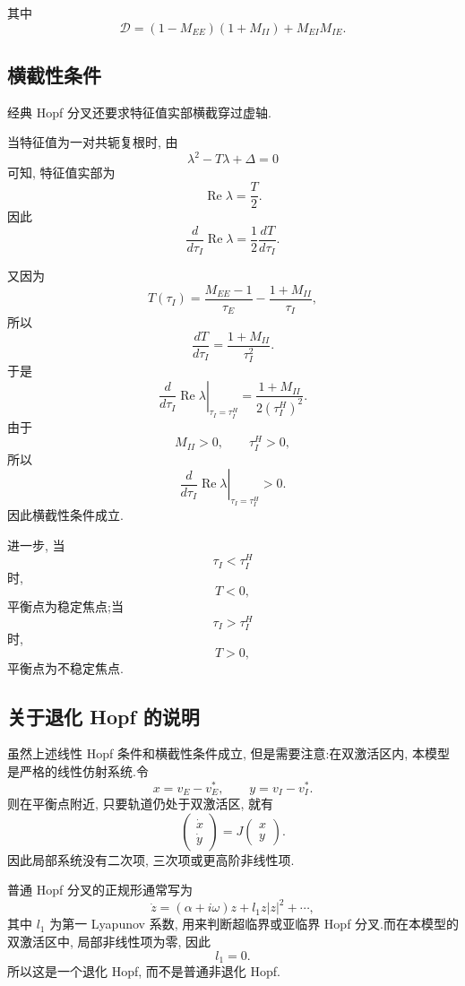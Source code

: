 ﻿\documentclass[UTF8,  zihao=-4]{ctexart}
\begin{document}
其中
\[
\mathcal D
=
(1-M_{EE})(1+M_{II})+M_{EI}M_{IE}.
\]

\subsection{横截性条件}

经典 Hopf 分叉还要求特征值实部横截穿过虚轴.

当特征值为一对共轭复根时,  由
\[
\lambda^2-T\lambda+\Delta=0
\]
可知,  特征值实部为
\[
\operatorname{Re}\lambda=\frac{T}{2}.
\]
因此
\[
\frac{d}{d\tau_I}\operatorname{Re}\lambda
=
\frac12\frac{dT}{d\tau_I}.
\]

又因为
\[
T(\tau_I)
=
\frac{M_{EE}-1}{\tau_E}
-
\frac{1+M_{II}}{\tau_I},  
\]
所以
\[
\frac{dT}{d\tau_I}
=
\frac{1+M_{II}}{\tau_I^2}.
\]
于是
\[
\left.
\frac{d}{d\tau_I}\operatorname{Re}\lambda
\right|_{\tau_I=\tau_I^H}
=
\frac{1+M_{II}}{2(\tau_I^H)^2}.
\]
由于
\[
M_{II}>0,  \qquad \tau_I^H>0,  
\]
所以
\[
\left.
\frac{d}{d\tau_I}\operatorname{Re}\lambda
\right|_{\tau_I=\tau_I^H}
>0.
\]
因此横截性条件成立.

进一步,  当
\[
\tau_I<\tau_I^H
\]
时,  
\[
T<0,  
\]
平衡点为稳定焦点;当
\[
\tau_I>\tau_I^H
\]
时,  
\[
T>0,  
\]
平衡点为不稳定焦点.

\subsection{关于退化 Hopf 的说明}

虽然上述线性 Hopf 条件和横截性条件成立,  但是需要注意:在双激活区内,  本模型是严格的线性仿射系统.令
\[
x=v_E-v_E^*,  
\qquad
y=v_I-v_I^*.
\]
则在平衡点附近,  只要轨道仍处于双激活区,  就有
\[
\begin{pmatrix}
\dot x\\
\dot y
\end{pmatrix}
=
J
\begin{pmatrix}
x\\
y
\end{pmatrix}.
\]
因此局部系统没有二次项,  三次项或更高阶非线性项.

普通 Hopf 分叉的正规形通常写为
\[
\dot z=(\alpha+i\omega)z+l_1z|z|^2+\cdots,  
\]
其中 \(l_1\) 为第一 Lyapunov 系数,  用来判断超临界或亚临界 Hopf 分叉.而在本模型的双激活区中,  局部非线性项为零,  因此
\[
l_1=0.
\]
所以这是一个退化 Hopf,  而不是普通非退化 Hopf.
\end{document}
